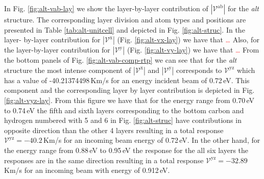 \documentclass[prb,11pt,tightenlines,twocolumn,aps]{revtex4-1}
\begin{document}
In Fig. \ref{fig:alt-vab-lay} we show the layer-by-layer contribution of
$|\mathcal{V}^{\mathrm{ab}}|$  for the \emph{alt} structure. The corresponding
layer division and atom types and positions are presented in Table 
% 
\ref{tab:alt-unitcell} and depicted in Fig. \ref{fig:alt-struc}. In the layer-
by-layer contribution for $|\mathcal{V}^{\mathrm{x}}|$ (Fig. \ref{fig:alt-vx-lay})
we have that
% 
\textcolor{red}{\ldots}
% 
Also, for the layer-by-layer contribution for $|\mathcal{V}^{\mathrm{y}}|$ (Fig.
\ref{fig:alt-vy-lay}) we have that
% 
\textcolor{red}{\ldots}
%
From the bottom panels of Fig. \ref{fig:alt-vab-comp-rtp} we can see that for
the \emph{alt} structure the most intense component of
$|\mathcal{V}^{\mathrm{x}}|$ and $|\mathcal{V}^{\mathrm{y}}|$ corresponds to
$\mathcal{V}^{\mathrm{yz}}$ which has a value of -40.21374498\,Km/s for an
energy incident beam of 0.72\,eV. This component and the corresponding layer by
layer contribution is depicted in Fig. \ref{fig:alt-vyz-lay}. From this figure
we have that for the energy range from 0.70\,eV to 0.74\,eV the fifth and sixth
layers corresponding to the bottom carbon and hydrogen numbered with 5 and 6 in
Fig. \ref{fig:alt-struc} have contributions in opposite direction than the other
4 layers resulting in a total response $\mathcal{V}^{\mathrm{yz}}= -40.2$\,Km/s
for an incoming beam energy of 0.72\,eV. In the other hand, for the energy range
from 0.88\,eV to 0.95\,eV the response for the all six layers the responses are
in the same direction resulting in a total response
$\mathcal{V}^{\mathrm{yz}}=-32.89$\,Km/s for an incoming beam with energy of
0.912\,eV.

\end{document}
